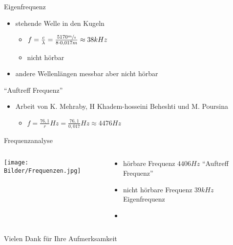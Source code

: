 \documentclass[12pt]{beamer}
\begin{document}
\begin{frame}{Eigenfrequenz}
\begin{itemize}
\item<1-> stehende Welle in den Kugeln
	\begin{itemize}
	\item<2->[$\rightarrow$] $f=\frac{c}{\lambda}=\frac{5170\sfrac{m}{s}}{8\cdot 0,017m}\approx 38kHz$
	\item<3->[$\rightarrow$] nicht hörbar
	\end{itemize}
\item<4-> andere Wellenlängen messbar aber nicht hörbar
\end{itemize}
\end{frame}

\begin{frame}{"`Auftreff Frequenz"'}
\begin{itemize}
\item<1-> Arbeit von K. Mehraby, H Khadem-hosseini Beheshti und M. Poursina\footnotemark
	\begin{itemize}
	\item<2->[$\rightarrow$] $f=\frac{76,1}{r}Hz=\frac{76,1}{0,017}Hz\approx 4476Hz$
	\end{itemize}
\end{itemize}
\end{frame}

\begin{frame}{Frequenzanalyse}
\begin{columns}
\begin{column}{.6\textwidth}
\texttt{[image: Bilder/Frequenzen.jpg]}
\end{column}
\begin{column}{.4\textwidth}
\begin{itemize}
\item<2-> hörbare Frequenz $4406Hz$ "`Auftreff Frequenz"'
\item<3-> nicht hörbare Frequenz $39kHz$ Eigenfrequenz
\item[ ] \ 
\end{itemize}
\end{column}
\end{columns}
\end{frame}

\begin{frame}
\center
{\HUGE Vielen Dank für Ihre Aufmerksamkeit}
\end{frame}
\end{document}
